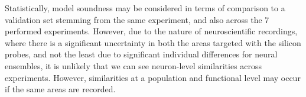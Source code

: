 \documentclass[mphil,deptreport,ianc]{infthesis} %
\begin{document}
Statistically, model soundness may be considered in terms of comparison to a validation set stemming from the same experiment, and also across the 7 performed experiments. However, due to the nature of neuroscientific recordings, where there is a significant uncertainty in both the areas targeted with the silicon probes, and not the least due to significant individual differences for neural ensembles, it is unlikely that we can see neuron-level similarities across experiments. However, similarities at a population and functional level may occur if the same areas are recorded.



 
 
 
 
 
 
 
 
\end{document}

